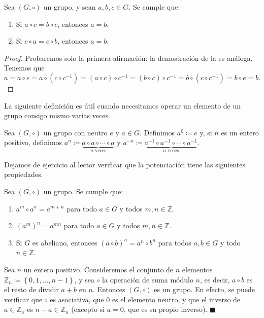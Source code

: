 \begin{proposition} \label{cancelacion_grupos}
	Sea $(G, \circ)$ un grupo, y sean $a, b, c \in G$. Se cumple que:
	\begin{enumerate}
		\item Si $a \circ c = b \circ c$, entonces $a = b$.
		\item Si $c \circ a = c \circ b$, entonces $a = b$.
	\end{enumerate}
\end{proposition}

\begin{proof}
Probaremos solo la primera afirmación: la demostración de la es análoga. Tenemos que
$$a = a \circ e = a \circ \left( c \circ c^{-1} \right) = \left(a \circ c \right) \circ c^{-1} = \left(b \circ c \right) \circ c^{-1} = b \circ \left( c \circ c^{-1} \right) = b \circ e = b.$$
\end{proof}

La siguiente definición es útil cuando necesitamos operar un elemento de un grupo consigo mismo varias veces. 

\begin{definition}
Sea $(G, \circ)$ un grupo con neutro $e$ y $a \in G$. Definimos $a^0 \coloneqq e$ y, si $n$ es un entero positivo, definimos $a^n \coloneqq \underbrace{a \circ a \circ \cdots \circ a}_{n \text{ veces}}$ y $a^{-n} \coloneqq \underbrace{a^{-1} \circ a^{-1} \circ \cdots \circ a^{-1}}_{n \text{ veces}}$.
\end{definition}

Dejamos de ejercicio al lector verificar que la potenciación tiene las siguientes propiedades.

\begin{prop} Sea $(G, \circ)$ un grupo. Se cumple que:
	\begin{enumerate}
		\item $a^m \circ a^n = a^{m+n}$ para todo $a \in G$ y todos $m, n \in \mathbb{Z}$.
		\item $\left( a^m \right)^n = a^{mn}$ para todo $a \in G$ y todos $m, n \in \mathbb{Z}$.
		\item Si $G$ es abeliano, entonces $\left( a \circ b \right)^{n} = a^n \circ b^n$ para todos $a, b \in G$ y todo $n \in \mathbb{Z}$.
	\end{enumerate}
\end{prop}


\begin{example} \label{grupo_ciclico}
Sea $n$ un entero positivo. Consideremos el conjunto de $n$ elementos $\mathbb{Z}_n \coloneq \left\{ 0, 1, \dots, n-1 \right\}$, y sea $\circ$ la operación de suma módulo $n$, es decir, $a \circ b$ es el resto de dividir $a+b$ en $n$. Entonces $(G, \circ)$ es un grupo. En efecto, se puede verificar que $\circ$ es asociativa, que $0$ es el elemento neutro, y que el inverso de $a \in \mathbb{Z}_n$ es $n-a \in \mathbb{Z}_n$ (excepto si $a = 0$, que es su propio inverso). \hfill$\blacksquare$
\end{example}

